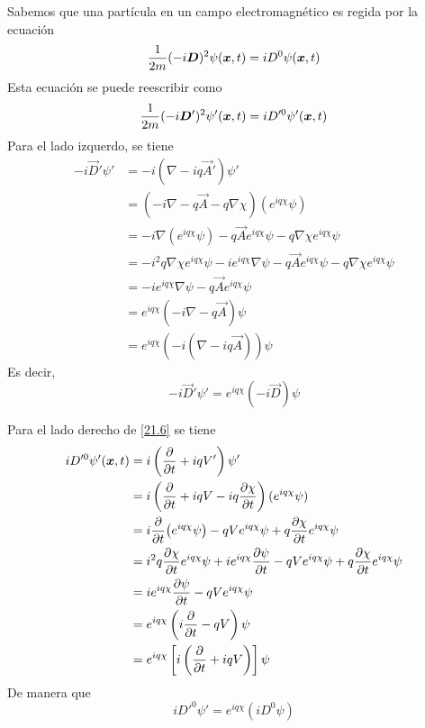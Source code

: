 \begin{prueba}
	Sabemos que una partícula en un campo electromagnético es regida por la ecuación 
	\begin{equation}
  \frac{1}{2m}(-i\vb*{D})^2\psi(\vb*{x},t) =iD^0\psi(\vb*{x},t) 
\end{equation}
Esta ecuación se puede reescribir como
\begin{equation}\label{21.6}
  \frac{1}{2m}(-i\vb*{D}')^2\psi'(\vb*{x},t) =iD'^0\psi'(\vb*{x},t) 
\end{equation}
Para el lado izquerdo, se tiene
\begin{align}
  -i\vec{D}'\psi'&=-i(\nabla-iq\vec{A}')\psi'\\
  &=(-i\nabla-q\vec{A}-q\nabla\chi )(e^{iq\chi }\psi)\\
  &=-i\nabla(e^{iq\chi }\psi)-q\vec{A}e^{iq\chi }\psi-q\nabla\chi e^{iq\chi }\psi\\
  &=-i^2q\nabla\chi e^{iq\chi }\psi-ie^{iq\chi }\nabla\psi -q\vec{A}e^{iq\chi }\psi	-q\nabla\chi e^{iq\chi }\psi\\
  &=-ie^{iq\chi }\nabla\psi-q\vec{A}e^{iq\chi }\psi\\
  &=e^{iq\chi }(-i\nabla-q\vec{A})\psi\\
  &=e^{iq\chi }(-i(\nabla-iq\vec{A}))\psi
\end{align}
Es decir,
\begin{equation}\label{21.7}
  \boxed{-i\vec{D}'\psi'=e^{iq\chi }(-i\vec{D})\psi}
\end{equation}

Para el lado derecho de \eqref{21.6} se tiene
\begin{align}
  iD'^0\psi'(\vb*{x},t) &=i\left(\pdv{t}+iqV'\right)\psi'\\
  &=i\left(\pdv{t}+iqV-iq\pdv{\chi}{t}\right)(e^{iq\chi }\psi)\\
  &=i\pdv{t}(e^{iq\chi }\psi )-qVe^{iq\chi }\psi +q\pdv{\chi}{t}e^{iq\chi }\psi\\
  &=i^2q\pdv{\chi}{t}e^{iq\chi }\psi +ie^{iq\chi }\pdv{\psi}{t}-qVe^{iq\chi }\psi+q\pdv{\chi }{t}e^{iq\chi }\psi\\
  &=ie^{iq\chi }\pdv{\psi}{t}-qVe^{iq\chi }\psi \\
  &=e^{iq\chi }\left(i\pdv{t}-qV\right)\psi \\
  &=e^{iq\chi }\left[i\left(\pdv{t}+iqV\right)\right]\psi
\end{align}
De manera que
\begin{equation}\label{21.8}
\boxed{   iD'^0\psi' =e^{iq\chi }(iD^0\psi )}
\end{equation}


\end{prueba}
